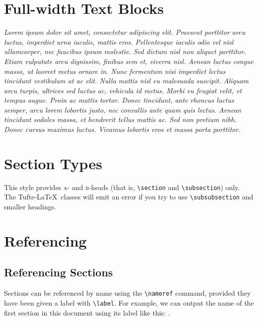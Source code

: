 \documentclass[a4paper]{tufte-handout} %
\begin{document}
\section{Full-width Text Blocks}\label{sec:fullwidthtextblocks}

\begin{fullwidth}
	\small\itshape Lorem ipsum dolor sit amet, consectetur adipiscing elit. Praesent porttitor arcu luctus, imperdiet urna iaculis, mattis eros. Pellentesque iaculis odio vel nisl ullamcorper, nec faucibus ipsum molestie. Sed dictum nisl non aliquet porttitor. Etiam vulputate arcu dignissim, finibus sem et, viverra nisl. Aenean luctus congue massa, ut laoreet metus ornare in. Nunc fermentum nisi imperdiet lectus tincidunt vestibulum at ac elit. Nulla mattis nisl eu malesuada suscipit. Aliquam arcu turpis, ultrices sed luctus ac, vehicula id metus. Morbi eu feugiat velit, et tempus augue. Proin ac mattis tortor. Donec tincidunt, ante rhoncus luctus semper, arcu lorem lobortis justo, nec convallis ante quam quis lectus. Aenean tincidunt sodales massa, et hendrerit tellus mattis ac. Sed non pretium nibh. Donec cursus maximus luctus. Vivamus lobortis eros et massa porta porttitor.
\end{fullwidth}


\section{Section Types}\label{sec:sectiontypes}

This style provides \textsc{a}- and \textsc{b}-heads (that is, \texttt{\textbackslash section} and \texttt{\textbackslash subsection}) only. The Tufte-\LaTeX\ classes will emit an error if you try to use \texttt{\textbackslash subsubsection} and smaller headings.


\section{Referencing}\label{sec:referencing}

\subsection{Referencing Sections}

Sections can be referenced by name using the \texttt{\textbackslash nameref} command, provided they have been given a label with \texttt{\textbackslash label}. For example, we can output the name of the first section in this document using its label like this: .
\end{document}
